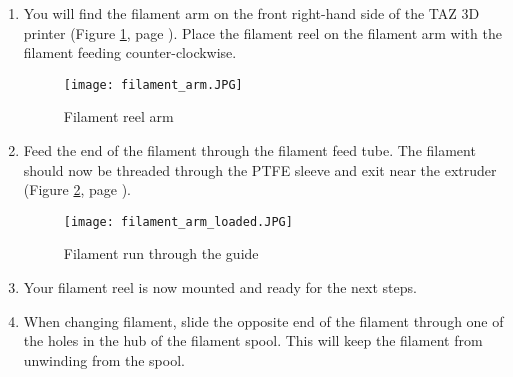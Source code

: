 \begin{enumerate}

\item You will find the filament arm on the front right-hand side of the TAZ 3D printer (Figure \ref{fig:filament_arm}, page \pageref{fig:filament_arm}). Place the filament reel on the filament arm with the filament feeding counter-clockwise.

\begin{figure}[H]
\centering
\texttt{[image: filament\_arm.JPG]}
\caption{Filament reel arm}
\label{fig:filament_arm}
\end{figure}

\item Feed the end of the filament through the filament feed tube. The filament should now be threaded through the PTFE sleeve and exit near the extruder (Figure \ref{fig:filament_arm_loaded}, page \pageref{fig:filament_arm_loaded}).

\begin{figure}[H]
\centering
\texttt{[image: filament\_arm\_loaded.JPG]}
\caption{Filament run through the guide}
\label{fig:filament_arm_loaded}
\end{figure}

\item Your filament reel is now mounted and ready for the next steps.

\item When changing filament, slide the opposite end of the filament through one of the holes in the hub of the filament spool. This will keep the filament from unwinding from the spool.

\end{enumerate}
